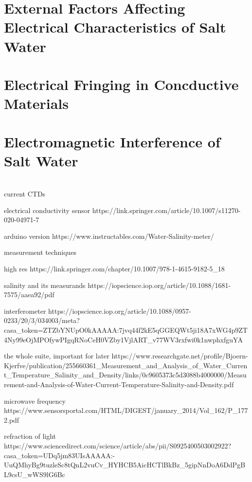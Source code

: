\section{External Factors Affecting Electrical Characteristics of Salt Water} \label{sec:external-factors-affecting-electrical-characteristics-of-salt-water}

\section{Electrical Fringing in Concductive Materials}

\section{Electromagnetic Interference of Salt Water}

\section{}

current CTDs

electrical conductivity sensor https://link.springer.com/article/10.1007/s11270-020-04971-7

arduino version https://www.instructables.com/Water-Salinity-meter/

measurement techniques

high res https://link.springer.com/chapter/10.1007/978-1-4615-9182-5_18

salinity and its measurands https://iopscience.iop.org/article/10.1088/1681-7575/aaea92/pdf

interferometer https://iopscience.iop.org/article/10.1088/0957-0233/20/3/034003/meta?casa_token=ZTZbYNUpO0kAAAAA:7jvq44f2kE5qGGEQWt5ji18A7xWG4p9ZT4Ny99eOjMPOfywPIgqRNoCeH0VZby1VjlART_v77WV3rxfwi0k1nwphxfguYA

the whole suite, important for later https://www.researchgate.net/profile/Bjoern-Kjerfve/publication/255660361_Measurement_and_Analysis_of_Water_Current_Temperature_Salinity_and_Density/links/0c9605373c5d3088b4000000/Measurement-and-Analysis-of-Water-Current-Temperature-Salinity-and-Density.pdf

microwave frequency https://www.sensorsportal.com/HTML/DIGEST/january_2014/Vol_162/P_1772.pdf

refraction of light https://www.sciencedirect.com/science/article/abs/pii/S0925400503002922?casa_token=UDq5jm83UIsAAAAA:-UuQMhyBg9tuzleSc8tQnL2vuCv_HYHCB5AicHCTlBkBz_5gipNnDoA6DdPgBL9csU_wWS9lG6Bc

